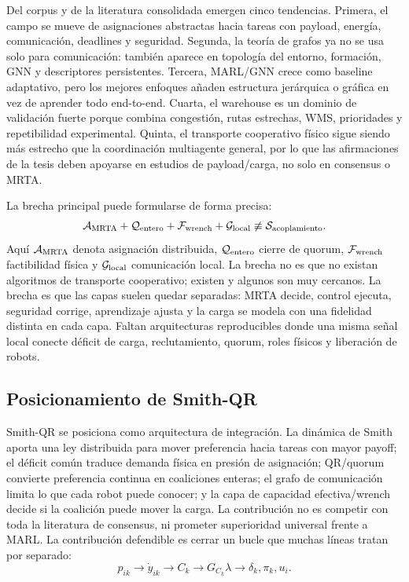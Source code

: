 Del corpus y de la literatura consolidada emergen cinco tendencias. Primera, el campo se
mueve de asignaciones abstractas hacia tareas con payload, energía, comunicación,
deadlines y seguridad. Segunda, la teoría de grafos ya no se usa solo para comunicación:
también aparece en topología del entorno, formación, GNN y descriptores persistentes.
Tercera, MARL/GNN crece como baseline adaptativo, pero los mejores enfoques añaden
estructura jerárquica o gráfica en vez de aprender todo end-to-end. Cuarta, el warehouse
es un dominio de validación fuerte porque combina congestión, rutas estrechas, WMS,
prioridades y repetibilidad experimental. Quinta, el transporte cooperativo físico sigue
siendo más estrecho que la coordinación multiagente general, por lo que las afirmaciones
de la tesis deben apoyarse en estudios de payload/carga, no solo en consensus o MRTA.

La brecha principal puede formularse de forma precisa:
\[
  \mathcal A_{\rm MRTA}
  + \mathcal Q_{\rm entero}
  + \mathcal F_{\rm wrench}
  + \mathcal G_{\rm local}
  \not\equiv
  \mathcal S_{\rm acoplamiento}.
\]
Aquí $\mathcal A_{\rm MRTA}$ denota asignación distribuida, $\mathcal Q_{\rm entero}$
cierre de quorum, $\mathcal F_{\rm wrench}$ factibilidad física y
$\mathcal G_{\rm local}$ comunicación local. La brecha no es que no existan algoritmos de
transporte cooperativo; existen y algunos son muy cercanos. La brecha es que las capas
suelen quedar separadas: MRTA decide, control ejecuta, seguridad corrige, aprendizaje
ajusta y la carga se modela con una fidelidad distinta en cada capa. Faltan arquitecturas
reproducibles donde una misma señal local conecte déficit de carga, reclutamiento,
quorum, roles físicos y liberación de robots.

\subsection{Posicionamiento de Smith-QR}

Smith-QR se posiciona como arquitectura de integración. La dinámica de Smith aporta una
ley distribuida para mover preferencia hacia tareas con mayor payoff; el déficit común
traduce demanda física en presión de asignación; QR/quorum convierte preferencia continua
en coaliciones enteras; el grafo de comunicación limita lo que cada robot puede conocer;
y la capa de capacidad efectiva/wrench decide si la coalición puede mover la carga. La
contribución no es competir con toda la literatura de consensus, ni prometer superioridad
universal frente a MARL. La contribución defendible es cerrar un bucle que muchas líneas
tratan por separado:
\[
  p_{ik}
  \longrightarrow
  \dot y_{ik}
  \longrightarrow
  C_k
  \longrightarrow
  G_{C_k}\lambda
  \longrightarrow
  \delta_k, \pi_k, u_i .
\]

